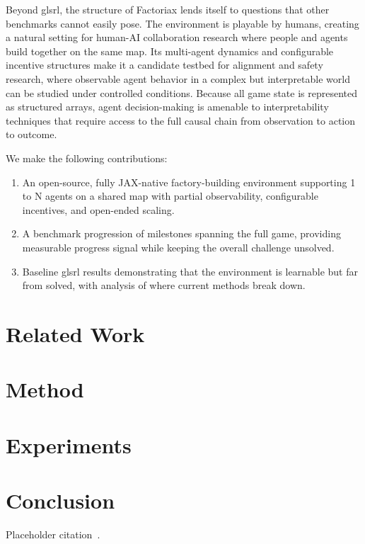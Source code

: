 \documentclass{article}
\begin{document}
Beyond gls{rl}, the structure of Factoriax lends itself to questions that other benchmarks cannot easily pose.
The environment is playable by humans, creating a natural setting for human-AI collaboration research where people and agents build together on the same map.
Its multi-agent dynamics and configurable incentive structures make it a candidate testbed for alignment and safety research, where observable agent behavior in a complex but interpretable world can be studied under controlled conditions.
Because all game state is represented as structured arrays, agent decision-making is amenable to interpretability techniques that require access to the full causal chain from observation to action to outcome.


We make the following contributions:
\begin{enumerate}
    \item An open-source, fully JAX-native factory-building environment supporting 1 to N agents on a shared map with partial observability, configurable incentives, and open-ended scaling.
    \item A benchmark progression of milestones spanning the full game, providing measurable progress signal while keeping the overall challenge unsolved.
    \item Baseline gls{rl} results demonstrating that the environment is learnable but far from solved, with analysis of where current methods break down.
\end{enumerate}


\section{Related Work}

\section{Method}

\section{Experiments}

\section{Conclusion}

Placeholder citation~\cite{placeholder}.



\end{document}
